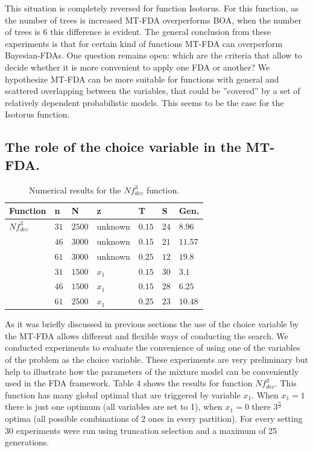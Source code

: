 \documentclass[10pt,thmsa]{article}
\begin{document}
This situation is completely reversed for function Isotorus. For this
function, as the number of trees is increased MT-FDA overperforms BOA, when
the number of trees is 6 this difference is evident. The general conclusion
from these experiments is that for certain kind of functions MT-FDA can
overperform Bayesian-FDAs. One question remains open: which are the criteria
that allow to decide whether it is more convenient to apply one FDA or
another? We hypothesize MT-FDA can be more suitable for functions with
general and scattered overlapping between the variables, that could be
''covered'' by a set of relatively dependent probabilistic models. This
seems to be the case for the Isotorus function.

\subsection{\protect\medskip The role of the choice variable in the MT-FDA.}

\begin{table}[htbp]
\begin{center}
\begin{tabular}{|l|l|l|l|l|l|l|}
\hline
Function & n & N & z & T & S & Gen. \\ \hline
$Nf_{dec}^3$ & $31$ & $2500$ & unknown & $0.15$ & $24$ & $8.96$ \\ \hline
& $46$ & $3000$ & unknown & $0.15$ & $21$ & $11.57$ \\ \hline
& $61$ & $3000$ & unknown & $0.25$ & $12$ & $19.8$ \\ \hline
& $31$ & $1500$ & $x_1$ & $0.15$ & $30$ & $3.1$ \\ \hline
& $46$ & $1500$ & $x_1$ & $0.15$ & $28$ & $6.25$ \\ \hline
& $61$ & $2500$ & $x_1$ & $0.25$ & $23$ & $10.48$ \\ \hline
\end{tabular}
\par
\end{center}
\caption{Numerical results for the $Nf_{dec}^3$ function.}
\end{table}

As it was briefly discussed in previous sections the use of the choice
variable by the MT-FDA allows different and flexible ways of conducting the
search. We conducted experiments to evaluate the convenience of using one of
the variables of the problem as the choice variable. These experiments are
very preliminary but help to illustrate how the parameters of the mixture
model can be conveniently used in the FDA framework. Table 4 shows the
results for function $Nf_{dec}^3$. This function has many global optimal
that are triggered by variable $x_1$. When $x_1=1$ there is just one optimum
(all variables are set to 1), when $x_1=0$ there $3^{\frac n3}$ optima (all
possible combinations of 2 ones in every partition). For every setting 30
experiments were run using truncation selection and a maximum of 25
generations.
\end{document}
